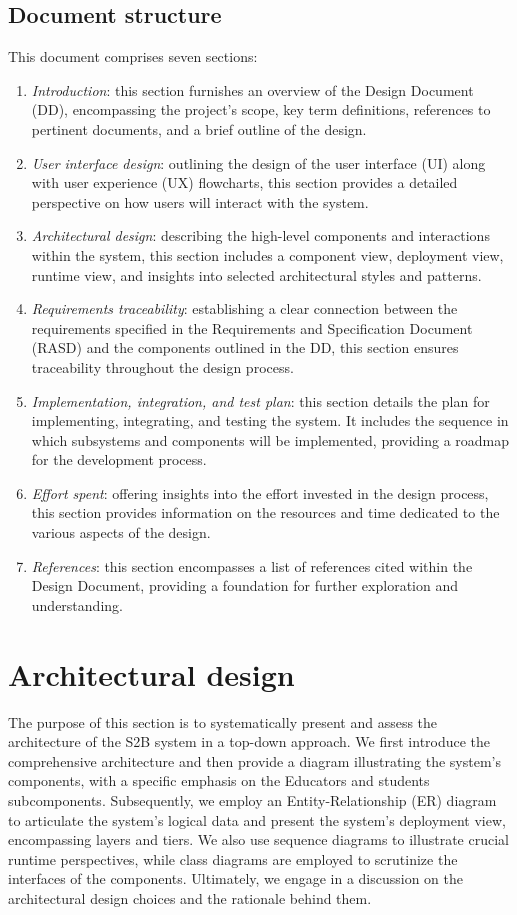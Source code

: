 \documentclass[12pt, a4paper]{report}
\begin{document}
    \section{Document structure}
    This document comprises seven sections:
    \begin{enumerate}
        \item \textit{Introduction}: this section furnishes an overview of the Design Document (DD), encompassing the project's scope, key term definitions, references to pertinent documents, and a brief outline of the design. 
        \item \textit{User interface design}: outlining the design of the user interface (UI) along with user experience (UX) flowcharts, this section provides a detailed perspective on how users will interact with the system. 
        \item \textit{Architectural design}: describing the high-level components and interactions within the system, this section includes a component view, deployment view, runtime view, and insights into selected architectural styles and patterns.
        \item \textit{Requirements traceability}: establishing a clear connection between the requirements specified in the Requirements and Specification Document (RASD) and the components outlined in the DD, this section ensures traceability throughout the design process.
        \item \textit{Implementation, integration, and test plan}: this section details the plan for implementing, integrating, and testing the system. 
            It includes the sequence in which subsystems and components will be implemented, providing a roadmap for the development process.
        \item \textit{Effort spent}: offering insights into the effort invested in the design process, this section provides information on the resources and time dedicated to the various aspects of the design.                 
        \item \textit{References}: this section encompasses a list of references cited within the Design Document, providing a foundation for further exploration and understanding.
    \end{enumerate}   


    \chapter{Architectural design}
    The purpose of this section is to systematically present and assess the architecture of the S2B system in a top-down approach. 
    We first introduce the comprehensive architecture and then provide a diagram illustrating the system's components, with a specific emphasis on the Educators and students subcomponents. 
    Subsequently, we employ an Entity-Relationship (ER) diagram to articulate the system's logical data and present the system's deployment view, encompassing layers and tiers. 
    We also use sequence diagrams to illustrate crucial runtime perspectives, while class diagrams are employed to scrutinize the interfaces of the components. 
    Ultimately, we engage in a discussion on the architectural design choices and the rationale behind them.
\end{document}
